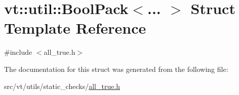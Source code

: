 \hypertarget{structvt_1_1util_1_1_bool_pack}{}\section{vt\+:\+:util\+:\+:Bool\+Pack$<$... $>$ Struct Template Reference}
\label{structvt_1_1util_1_1_bool_pack}


{\ttfamily \#include $<$all\+\_\+true.\+h$>$}



The documentation for this struct was generated from the following file\+:\begin{DoxyCompactItemize}
\item 
src/vt/utils/static\+\_\+checks/\hyperlink{all__true_8h}{all\+\_\+true.\+h}\end{DoxyCompactItemize}

